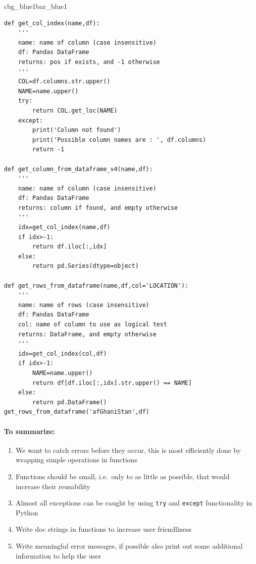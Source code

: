 \documentclass[%
oneside,                 %
final,                   %
10pt]{article}
\newenvironment{_pro_tight}[2]{
   \def\FrameCommand{\color{#2}\vrule width 1mm\normalcolor\colorbox{#1}}
   \FrameRule0.6pt\MakeFramed {\advance\hsize-2mm\FrameRestore}\vskip3mm}
   {\vskip0mm\endMakeFramed}
\newenvironment{pro}[2]{
\bgroup\rmfamily
\fboxsep=0mm\relax
\begin{_pro_tight}{#1}{#2}
\list{}{\parsep=-2mm\parskip=0mm\topsep=0pt\leftmargin=2mm
\rightmargin=2\leftmargin\leftmargin=4pt\relax}
\item\relax}
{\endlist\end{_pro_tight}\egroup}
\begin{document}
\begin{pro}{cbg_blue1}{bar_blue1}\begin{Verbatim}[numbers=none,fontsize=\fontsize{9pt}{9pt},baselinestretch=0.95,xleftmargin=2mm]
def get_col_index(name,df):
    '''
    name: name of column (case insensitive)
    df: Pandas DataFrame
    returns: pos if exists, and -1 otherwise 
    '''
    COL=df.columns.str.upper()
    NAME=name.upper()
    try:
        return COL.get_loc(NAME)
    except:
        print('Column not found')
        print('Possible column names are : ', df.columns)
        return -1

def get_column_from_dataframe_v4(name,df):
    '''
    name: name of column (case insensitive)
    df: Pandas DataFrame
    returns: column if found, and empty otherwise 
    '''
    idx=get_col_index(name,df)
    if idx>-1:
        return df.iloc[:,idx]
    else:
        return pd.Series(dtype=object)
        
def get_rows_from_dataframe(name,df,col='LOCATION'):
    '''
    name: name of rows (case insensitive)
    df: Pandas DataFrame
    col: name of column to use as logical test
    returns: DataFrame, and empty otherwise 
    '''
    idx=get_col_index(col,df)
    if idx>-1:
        NAME=name.upper()
        return df[df.iloc[:,idx].str.upper() == NAME]
    else:
        return pd.DataFrame()
get_rows_from_dataframe('afGhaniStan',df)

\end{Verbatim}
\end{pro}
\noindent


\paragraph{To summarize:}

\begin{enumerate}
\item We want to catch errors before they occur, this is most efficiently done by wrapping simple operations in functions

\item Functions should be small, i.e.~only to as little as possible, that would increase their reusability

\item Almost all exceptions can be caught by using \texttt{try} and \texttt{except} functionality in Python

\item Write doc strings in functions to increase user friendliness

\item Write meaningful error messages, if possible also print out some additional information to help the user 
\end{enumerate}

\noindent





\end{document}
